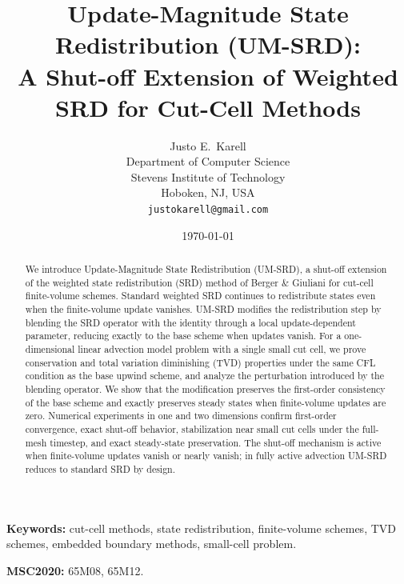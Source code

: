 \documentclass[11pt]{article}
\title{Update-Magnitude State Redistribution (UM-SRD):\\
A Shut-off Extension of Weighted SRD for Cut-Cell Methods}
\author{Justo E.\ Karell \\ Department of Computer Science \\ Stevens Institute of Technology \\ Hoboken, NJ, USA \\
\texttt{justokarell@gmail.com}
}
\date{\today}
\begin{document}
\maketitle


\begin{abstract}
We introduce Update-Magnitude State Redistribution (UM-SRD), a shut-off
extension of the weighted state redistribution (SRD) method of Berger
\& Giuliani for cut-cell finite-volume schemes. Standard weighted SRD
continues to redistribute states even when the finite-volume update
vanishes. UM-SRD modifies the redistribution step by blending the SRD
operator with the identity through a local update-dependent parameter,
reducing exactly to the base scheme when updates vanish. For a
one-dimensional linear advection model problem with a single small cut
cell, we prove conservation and total variation diminishing (TVD)
properties under the same CFL condition as the base upwind scheme, and
analyze the perturbation introduced by the blending operator. We show
that the modification preserves the first-order consistency of the base
scheme and exactly preserves steady states when finite-volume updates are
zero. Numerical experiments in one and two dimensions confirm first-order 
convergence, exact shut-off behavior, stabilization near small cut cells 
under the full-mesh timestep, and exact steady-state preservation. The 
shut-off mechanism is active when finite-volume updates vanish or nearly 
vanish; in fully active advection UM-SRD reduces to standard SRD by design.
\end{abstract}

\noindent\textbf{Keywords:} cut-cell methods, state redistribution, 
finite-volume schemes, TVD schemes, embedded boundary methods, small-cell problem.

\smallskip
\noindent\textbf{MSC2020:} 65M08, 65M12.

\end{document}
